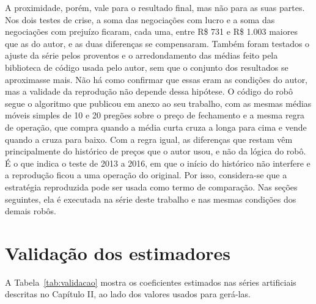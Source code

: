 A proximidade, porém, vale para o resultado final, mas não para as suas partes.
Nos dois testes de crise, a soma das negociações com lucro e a soma das
negociações com prejuízo ficaram, cada uma, entre R\$ 731 e R\$ 1.003 maiores que
as do autor, e as duas diferenças se compensaram. Também foram testados o ajuste
da série pelos proventos e o arredondamento das médias feito pela biblioteca de
código usada pelo autor, sem que o conjunto dos resultados se aproximasse mais.
Não há como confirmar que essas eram as condições do autor, mas a validade da
reprodução não depende dessa hipótese. O código do robô segue o algoritmo que
 publicou em anexo ao seu trabalho, com as mesmas médias
móveis simples de 10 e 20 pregões sobre o preço de fechamento e a mesma regra de
operação, que compra quando a média curta cruza a longa para cima e vende quando
a cruza para baixo. Com a regra igual, as diferenças que restam vêm
principalmente do histórico de preços que o autor usou, e não da lógica do robô.
É o que indica o teste de 2013 a 2016, em que o início do histórico não
interfere e a reprodução ficou a uma operação do original. Por isso, considera-se que a
estratégia reproduzida pode ser usada como termo de comparação. Nas seções seguintes, ela é executada na série deste trabalho e nas mesmas
condições dos demais robôs.

\section{Validação dos estimadores}
\label{sec:res-validacao}

A Tabela~\ref{tab:validacao} mostra os coeficientes estimados nas séries
artificiais descritas no Capítulo II, ao lado dos valores usados para gerá-las.

